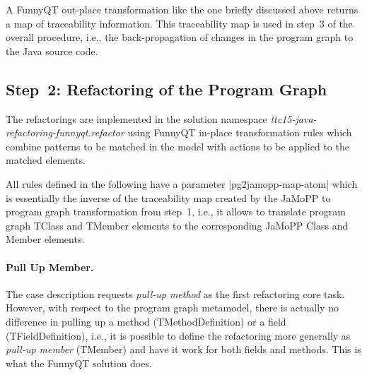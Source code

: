 \documentclass[submission]{eptcs}
\newcommand{\code}{\clojureinline}
\begin{document}
A FunnyQT out-place transformation like the one briefly discussed above returns
a map of traceability information.  This traceability map is used in step~3 of
the overall procedure, i.e., the back-propagation of changes in the program
graph to the Java source code.


\subsection{Step~2: Refactoring of the Program Graph}
\label{sec:step-2:refactoring-pg}

The refactorings are implemented in the solution namespace
\emph{ttc15-java-refactoring-funnyqt.refactor} using FunnyQT in-place
transformation rules which combine patterns to be matched in the model with
actions to be applied to the matched elements.

All rules defined in the following have a parameter \code|pg2jamopp-map-atom|
which is essentially the inverse of the traceability map created by the JaMoPP
to program graph transformation from step~1, i.e., it allows to translate
program graph \textsf{TClass} and \textsf{TMember} elements to the
corresponding JaMoPP \textsf{Class} and \textsf{Member} elements.

\paragraph{Pull Up Member.}

The case description requests \emph{pull-up method} as the first refactoring
core task.  However, with respect to the program graph metamodel, there is
actually no difference in pulling up a method (\textsf{TMethodDefinition}) or a
field (\textsf{TFieldDefinition}), i.e., it is possible to define the
refactoring more generally as \emph{pull-up member} (\textsf{TMember}) and have
it work for both fields and methods.  This is what the FunnyQT solution does.
\end{document}
